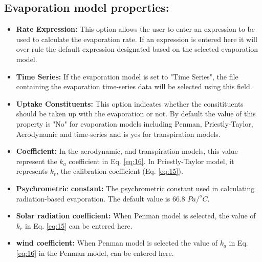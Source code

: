 \subsection{Evaporation model properties: }
\begin{itemize}
    \item \textbf{Rate Expression: } This option allows the user to enter an expression to be used to calculate the evaporation rate. If an expression is entered here it will over-rule the default expression designated based on the selected evaporation model. 
    \item \textbf{Time Series: } If the evaporation model is set to "Time Series", the file containing the evaporation time-series data will be selected using this field. 
    \item \textbf{Uptake Constituents: } This option indicates whether the consitituents should be taken up with the evaporation or not. By default the value of this property is "No" for evaporation models including Penman, Priestly-Taylor, Aerodynamic and time-series and is yes for transpiration models. 
    \item \textbf{Coefficient: } In the aerodynamic, and transpiration models, this value represent the $k_a$ coefficient in Eq. \ref{eq:16}. In Priestly-Taylor model, it represents $k_r$, the calibration coefficient (Eq. \ref{eq:15}). 
    \item \textbf{Psychrometric constant: } The psychrometric constant used in calculating radiation-based evaporation. The default value is 66.8 $Pa/^oC$. 
    \item \textbf{Solar radiation coefficient: } When Penman model is selected, the value of $k_r$ in Eq. \ref{eq:15} can be entered here.
    \item \textbf{wind coefficient: } When Penman model is selected the value of $k_a$ in Eq. \ref{eq:16} in the Penman model, can be entered here.
 \end{itemize}